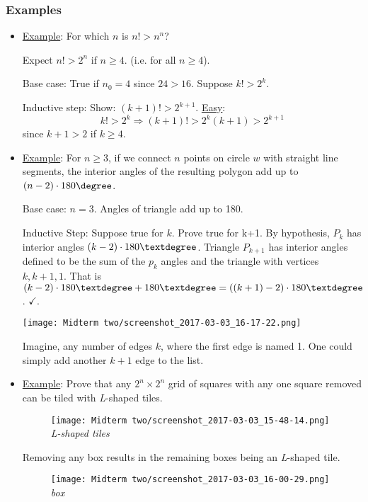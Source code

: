 \documentclass[12pt]{article}
\newcommand\deg{\textdegree}
\begin{document}
\subsubsection{Examples}
\label{sec:orgbc12762}
\begin{itemize}
\item \uline{Example}: For which \(n\) is \(n!>n^{n}\)?

Expect \(n!>2^n\) if \(n\ge{}4\). (i.e. for all \(n\ge{}4\)).

Base case: True if \(n_{0}=4\) since \(24>16\). Suppose \(k!>2^{k}\). 

Inductive step: Show: \((k+1)!>2^{k+1}\). \uline{Easy}: $$k!>2^{k} \Rightarrow
      (k+1)!>2^{k}(k+1)>2^{k+1}$$ since \(k+1>2\) if \(k\ge{}4\).

\item \uline{Example}: For \(n\ge3\), if we connect \(n\) points on circle \(w\) with straight
line segments, the interior angles of the resulting polygon add up to
\((n-2)\cdot180\degree\).

Base case: \(n=3\). Angles of triangle add up to 180\textdegree{}. 

Inductive Step: Suppose true for \(k\). Prove true for k+1. By hypothesis,
\(P_{k}\) has interior angles \((k-2)\cdot180\deg\). Triangle \(P_{k+1}\) has
interior angles defined to be the sum of the \(p_{k}\) angles and the triangle
with vertices \(k, k+1, 1\). That is \((k-2)\cdot180\deg + 180\deg =
      ((k+1)-2)\cdot180\deg\). \(\checkmark\).

\begin{center}
\texttt{[image: Midterm two/screenshot\_2017-03-03\_16-17-22.png]}
\end{center} Imagine, any number of
edges \(k\), where the first edge is named 1. One could simply add another
\(k+1\) edge to the list.

\item \uline{Example}: Prove that any \(2^n\times2^n\) grid of squares with any one
square removed can be tiled with \emph{L}-shaped tiles.

\begin{figure}[htbp]
\centering
\texttt{[image: Midterm two/screenshot\_2017-03-03\_15-48-14.png]}
\Leftarrow\textit{L-shaped tiles}
\end{figure} Removing any box
results in the remaining boxes being an \emph{L}-shaped tile.

\begin{figure}[htbp]
\centering
\texttt{[image: Midterm two/screenshot\_2017-03-03\_16-00-29.png]}
\Leftarrow\textit{box}
\end{figure} 


\end{itemize}
\end{document}
